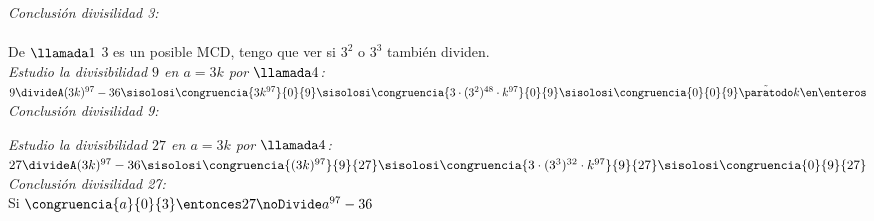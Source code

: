 \textit{Conclusión divisilidad 3: }\\
\\

De $\llamada1$ 3 es un posible MCD, tengo que ver si $3^2$ o $3^3$ también dividen.\\

\textit{Estudio la divisibilidad $9$ en $a = 3k$ por $\llamada4$:}\\
$ 9 \divideA (3k)^{97} - 36
	\sisolosi
	\congruencia{3k^{97}}{0}{9}
	\sisolosi
    \congruencia{3 \cdot (3^2)^{48}\cdot k^{97}}{0}{9}
    \sisolosi
	\congruencia{0}{0}{9}\Tilde \paratodo k \en \enteros 
$\\

\textit{Conclusión divisilidad 9: }\\
\Tilde


\textit{Estudio la divisibilidad $27$ en $a = 3k$ por $\llamada4$:}\\
$ 27 \divideA (3k)^{97} - 36
	\sisolosi
    \congruencia{(3k)^{97}}{9}{27}
	\sisolosi
    \congruencia{3 \cdot (3^3)^{32} \cdot k^{97}}{9}{27}
    \sisolosi
    \congruencia{0}{9}{27} 
$\\

\textit{Conclusión divisilidad 27: }\\
Si $\congruencia{a}{0}{3} \entonces 27 \noDivide a^{97} - 36$\\

